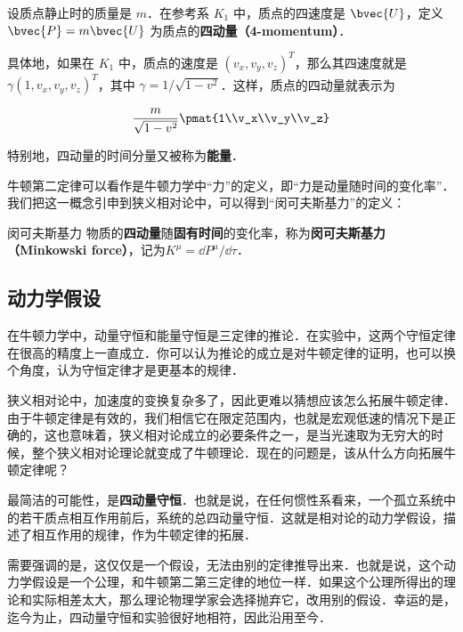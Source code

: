 设质点静止时的质量是 $m$．在参考系 $K_1$ 中，质点的四速度是 $\bvec{U}$，定义 $\bvec{P}=m\bvec{U}$ 为质点的\textbf{四动量（4-momentum）}．

具体地，如果在 $K_1$ 中，质点的速度是 $(v_x, v_y, v_z)^T$，那么其四速度就是 $\gamma(1, v_x, v_y, v_z)^T$，其中 $\gamma=1/\sqrt{1-v^2}$．这样，质点的四动量就表示为

\begin{equation}
\frac{m}{\sqrt{1-v^2}}\pmat{1\\v_x\\v_y\\v_z}
\end{equation}

特别地，四动量的时间分量又被称为\textbf{能量}．

牛顿第二定律可以看作是牛顿力学中“力”的定义，即“力是动量随时间的变化率”．我们把这一概念引申到狭义相对论中，可以得到“闵可夫斯基力”的定义：

\begin{definition}{闵可夫斯基力}
物质的\textbf{四动量}随\textbf{固有时间}的变化率，称为\textbf{闵可夫斯基力（Minkowski force）}，记为$K^{\mu}=\dd P^\mu/\dd\tau$．
\end{definition}


\subsection{动力学假设}

在牛顿力学中，动量守恒和能量守恒是三定律的推论．在实验中，这两个守恒定律在很高的精度上一直成立．你可以认为推论的成立是对牛顿定律的证明，也可以换个角度，认为守恒定律才是更基本的规律．

狭义相对论中，加速度的变换复杂多了，因此更难以猜想应该怎么拓展牛顿定律．由于牛顿定律是有效的，我们相信它在限定范围内，也就是宏观低速的情况下是正确的，这也意味着，狭义相对论成立的必要条件之一，是当光速取为无穷大的时候，整个狭义相对论理论就变成了牛顿理论．现在的问题是，该从什么方向拓展牛顿定律呢？

最简洁的可能性，是\textbf{四动量守恒}．也就是说，在任何惯性系看来，一个孤立系统中的若干质点相互作用前后，系统的总四动量守恒．这就是相对论的动力学假设，描述了相互作用的规律，作为牛顿定律的拓展．

需要强调的是，这仅仅是一个假设，无法由别的定律推导出来．也就是说，这个动力学假设是一个公理，和牛顿第二第三定律的地位一样．如果这个公理所得出的理论和实际相差太大，那么理论物理学家会选择抛弃它，改用别的假设．幸运的是，迄今为止，四动量守恒和实验很好地相符，因此沿用至今．




